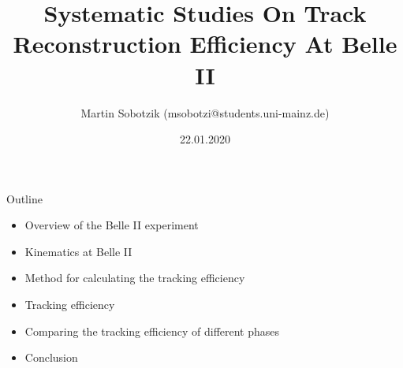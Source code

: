 \documentclass[8pt]{beamer}
\title{{\myfont Systematic Studies On Track Reconstruction Efficiency At Belle II}}
\date{22.01.2020}
\author{Martin Sobotzik (msobotzi@students.uni-mainz.de)}
\institute{Johannes Gutenberg-Universit\"at Mainz}
\begin{document}
	
\begin{frame}[noframenumbering]
	\titlepage


	
\end{frame}



	
	



%


\newcommand{\boundellipse}[3]%
{(#1) ellipse (#2 and #3)
}

\begin{frame}{Outline}




	\begin{itemize}
		\item Overview of the Belle II experiment
		\item Kinematics at Belle II
		\item Method for calculating the tracking efficiency
		\item Tracking efficiency
		\item Comparing the tracking efficiency of different phases
		\item Conclusion
		
		
	\end{itemize}
\end{frame}
\end{document}
